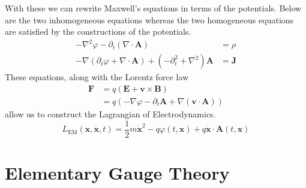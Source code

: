With these we can rewrite Maxwell's equations in terms of the potentials. Below
are the two inhomogeneous equations whereas the two homogeneous equations are
satisfied by the constructions of the potentials.
\begin{align}
    -\nabla ^{2}\varphi - \partial_t (\nabla \cdot \mathbf{A})                                & = \rho       \label{eq:maxPot1} \\
    -\nabla(\partial_t\varphi + \nabla\cdot\mathbf{A}) + (-\partial_t^2 + \nabla^2)\mathbf{A} & = \mathbf{J} \label{eq:maxPot2}
\end{align}
These equations, along with the Lorentz force law
\begin{align}\label{eq:lorentz}
    \mathbf{F} & = q\left(\mathbf{E} + \mathbf{v}\times\mathbf{B}\right) \nonumber                         \\
               & = q\left(-\nabla\varphi - \partial_t\mathbf{A} + \nabla(\mathbf{v}\cdot\mathbf{A})\right)
\end{align}
allow us to construct the Lagrangian of Electrodynamics.
\begin{equation}\label{eq:lagEM}
    L_\text{EM}(\mathbf{x}, \dot{\mathbf{x}},t) = \frac{1}{2}m\dot{\mathbf{x}}^2 - q\varphi(t,\mathbf{x}) + q\dot{\mathbf{x}}\cdot\mathbf{A}(t,\mathbf{x})
\end{equation}


\section{Elementary Gauge Theory}

